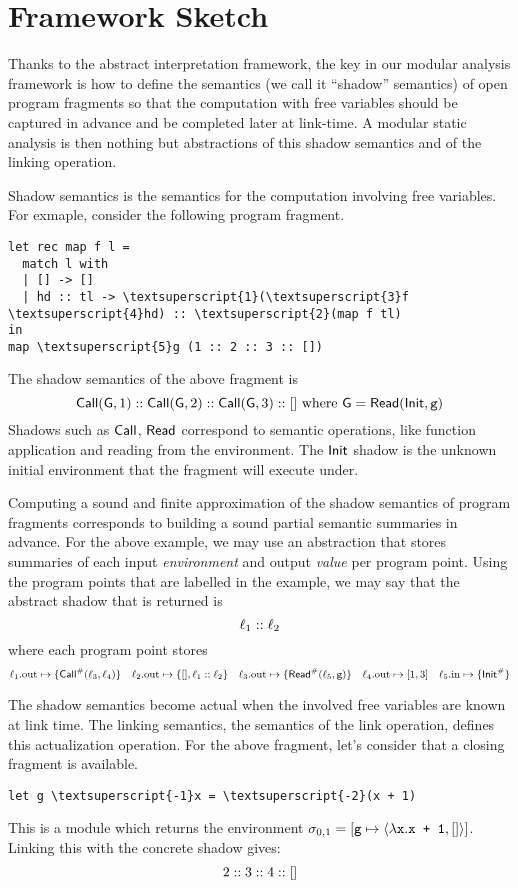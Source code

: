 \documentclass{article}
\begin{document}
\section{Framework Sketch}
Thanks to the abstract interpretation framework, the key in our
modular analysis framework is how to define the semantics (we call it
``shadow'' semantics) of open program fragments so that the
computation with free variables should be captured in advance
and be completed later at link-time. A modular static analysis is
then nothing but abstractions of this shadow semantics and of the
linking operation.

Shadow semantics is the semantics for the computation involving
free variables. For exmaple, consider the following program fragment.
\begin{center}
  \begin{BVerbatim}[commandchars=\\\{\}]
let rec map f l =
  match l with
  | [] -> []
  | hd :: tl -> \textsuperscript{1}(\textsuperscript{3}f \textsuperscript{4}hd) :: \textsuperscript{2}(map f tl)
in
map \textsuperscript{5}g (1 :: 2 :: 3 :: [])
  \end{BVerbatim}
\end{center}
The shadow semantics of the above fragment is
\[\textsf{Call}(\textsf{G},1)::\textsf{Call}(\textsf{G},2)::\textsf{Call}(\textsf{G},3)::[]\text{ where }\textsf{G}=\textsf{Read}(\textsf{Init},\texttt{g})\]
Shadows such as $\textsf{Call}$, $\textsf{Read}$ correspond to semantic operations, like function application and reading from the environment.
The $\textsf{Init}$ shadow is the unknown initial environment that the fragment will execute under.

Computing a sound and finite approximation of the shadow
semantics of program fragments corresponds to building a sound partial
semantic summaries in advance. For the above example,
we may use an abstraction that stores summaries of each input \emph{environment} and output \emph{value} per program point.
Using the program points that are labelled in the example, we may say that the abstract shadow that is returned is
\[\ell_1:: \ell_2\]
where each program point stores
\[
  \ell_1.\text{out}\mapsto\{{\textsf{Call}}^{\#}(\ell_3,\ell_4)\}\quad
  \ell_2.\text{out}\mapsto\{[],\ell_1:: \ell_2\}\quad
  \ell_3.\text{out}\mapsto\{{\textsf{Read}}^{\#}(\ell_5,\texttt{g})\}\quad
  \ell_4.\text{out}\mapsto[1,3]\quad
  \ell_5.\text{in}\mapsto\{{\textsf{Init}}^{\#}\}
\]

The shadow semantics become actual when the involved free variables
are known at link time. The linking semantics, the semantics of the link
operation, defines this actualization operation. For the above fragment, let's
consider that a closing fragment is available.
\begin{center}
  \begin{BVerbatim}[commandchars=\\\{\}]
let g \textsuperscript{-1}x = \textsuperscript{-2}(x + 1)
  \end{BVerbatim}
\end{center}
This is a module which returns the environment $\sigma_{0,1}=[\texttt{g}\mapsto\langle\lambda\texttt{x}.\texttt{x + 1},[]\rangle]$.
Linking this with the concrete shadow gives:
\[2::3::4::[]\]
\end{document}
